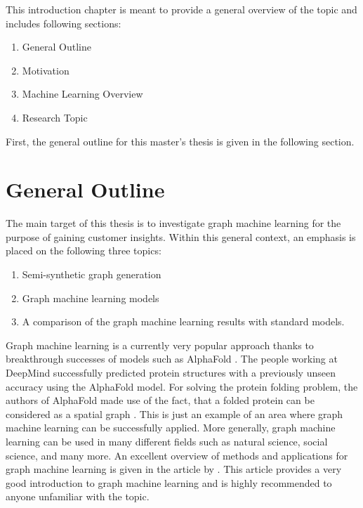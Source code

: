 	
	This introduction chapter is meant to provide a general overview of the
	topic and includes following sections:

	\begin{enumerate}
		\item General Outline
		\item Motivation
		\item Machine Learning Overview
		\item Research Topic
	\end{enumerate}

	\noindent First, the general outline for this master's thesis is given in
	the following section.
	
	\section{General Outline}

	The main target of this thesis is to investigate graph machine learning for
	the purpose of gaining customer insights. Within this general context, an
	emphasis is placed on the following three topics:

	\begin{enumerate}
		\item Semi-synthetic graph generation
		\item Graph machine learning models
		\item A comparison of the graph machine learning results with standard
			models.
	\end{enumerate}

	\noindent Graph machine learning is a currently very popular approach 
	thanks to breakthrough successes of models such as AlphaFold 
	\citep{senior2020improved}. The people working at DeepMind successfully
	predicted protein structures with a previously unseen accuracy using the 
	AlphaFold model. For solving the protein folding problem, the authors of
	AlphaFold made use of the fact, that a folded protein can be considered as
	a spatial graph \citep{AlphaFoldTeam2020}. This is just an example of an
	area where graph machine learning can be successfully applied. More
	generally, graph machine learning can be used in many different fields
	such as natural science, social science, and many more. An excellent
	overview of methods and applications for graph machine learning is given in
	the article by \cite{zhou2020graph}. This article provides a very good
	introduction to graph machine learning and is highly recommended to anyone
	unfamiliar with the topic. \\

